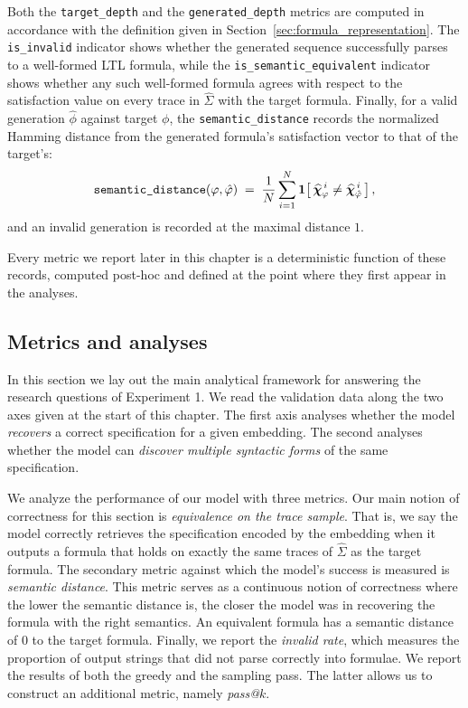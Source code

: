 \documentclass[titlepage,a4paper,11pt]{report}
\DeclareRobustCommand{\RSnew}[1]{{\color{blue!65!black}#1}}
\begin{document}
    Both the \texttt{target\_depth} and the \texttt{generated\_depth} metrics are computed in accordance with the definition given in Section~\ref{sec:formula_representation}. The \texttt{is\_invalid} indicator shows whether the generated sequence successfully parses to a well-formed LTL formula, while the \texttt{is\_semantic\_equivalent} indicator shows whether any such well-formed formula agrees with respect to the satisfaction value on every trace in $\widehat{\Sigma}$ with the target formula. Finally, for a valid generation $\hat\phi$ against target $\phi$, the \texttt{semantic\_distance} records the normalized Hamming distance from the generated formula's satisfaction vector to that of the target's:
    \begin{equation}
        \texttt{semantic\_distance}(\varphi, \hat{\varphi}) \;=\; \frac{1}{N}\sum_{i=1}^{N} \mathbf{1}\!\left[\,\bm{\widehat\chi}_{\varphi}^{\,i} \neq \bm{\widehat\chi}_{\hat{\varphi}}^{\,i}\,\right],
        \label{eq:semantic_distance}
    \end{equation}
    and an invalid generation is recorded at the maximal distance $1$.

    Every metric we report later in this chapter is a deterministic function of these records, computed post-hoc and defined at the point where they first appear in the analyses.

    
    \subsection{Metrics and analyses}\label{sec:exp1_analyses}
    In this section we lay out the main analytical framework for answering the research questions of Experiment 1. We read the validation data along the two axes \RSnew{given at the start of this chapter}. The first axis analyses whether the model \emph{recovers} a correct specification for a given embedding. The second analyses whether the model can \emph{discover multiple syntactic forms} of the same specification. 
    
    We analyze the performance of our model with three metrics. Our main notion of correctness for this section is \textit{equivalence on the trace sample}. That is, we say the model correctly retrieves the specification encoded by the embedding when it outputs a formula that holds on exactly the same traces of $\widehat\Sigma$ as the target formula. The secondary metric against which the model's success is measured is \textit{semantic distance}. This metric serves as a continuous notion of correctness where the lower the semantic distance is, the closer the model was in recovering the formula with the right semantics. An equivalent formula has a semantic distance of 0 to the target formula. Finally, we report the \textit{invalid rate}, which measures the proportion of output strings that did not parse correctly into formulae.  We report the results of both the greedy and the sampling pass. The latter allows us to construct an additional metric, namely \textit{pass@$k$}.
\end{document}
